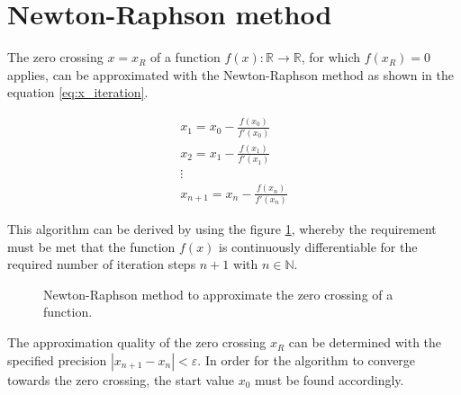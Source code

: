 \section{Newton-Raphson method} \label{sec:newton_raphson_method}
The zero crossing $x = x_R$ of a function $f\left( x \right) : \mathbb{R} \to \mathbb{R}$, for which $f\left( x_R \right) = 0$ applies, can be approximated with the Newton-Raphson method as shown in the equation \ref{eq:x_iteration}.
\begin{center}
	\begin{equation} \label{eq:x_iteration}
		\begin{gathered}
			x_1 = x_0 - \frac{f\left( x_0 \right)}{f'\left( x_0 \right)} \\
			x_2 = x_1 - \frac{f\left( x_1 \right)}{f'\left( x_1 \right)} \\
			\vdots \\
			x_{n + 1} = x_n - \frac{f\left( x_n \right)}{f'\left( x_n \right)}
		\end{gathered}
	\end{equation}
\end{center}
This algorithm can be derived by using the figure \ref{fig:tikz_newton_method}, whereby the requirement must be met that the function $f\left( x \right)$ is continuously differentiable for the required number of iteration steps $n + 1$ with $n \in \mathbb{N}$.
\begin{figure}[h!]
	\centering
	
	\caption{Newton-Raphson method to approximate the zero crossing of a function.}
	\label{fig:tikz_newton_method}
\end{figure}
The approximation quality of the zero crossing $x_R$ can be determined with the specified precision $\left| x_{n + 1} - x_n \right| < \varepsilon$. In order for the algorithm to converge towards the zero crossing, the start value $x_0$ must be found accordingly.

